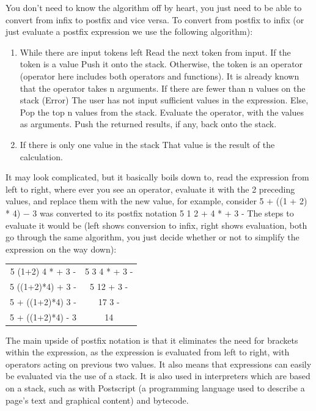 You don't need to know the algorithm off by heart, you just need to be able to convert from infix to postfix and vice versa. To convert from postfix to infix (or just evaluate a postfix expression we use the following algorithm):
\begin{enumerate}
	\item While there are input tokens left
		Read the next token from input.
		If the token is a value
			Push it onto the stack.
		Otherwise, the token is an operator (operator here includes both operators and functions).
			It is already known that the operator takes n arguments.
			If there are fewer than n values on the stack
				(Error) The user has not input sufficient values in the expression.
			Else, Pop the top n values from the stack.
			Evaluate the operator, with the values as arguments.
			Push the returned results, if any, back onto the stack.
	\item If there is only one value in the stack
		That value is the result of the calculation.
\end{enumerate}

It may look complicated, but it basically boils down to, read the expression from left to right, where ever you see an operator, evaluate it with the 2 preceding values, and replace them with the new value, for example,
consider 5 + ((1 + 2) * 4) − 3 was converted to its postfix notation
5 1 2 + 4 * + 3 -
The steps to evaluate it would be (left shows conversion to infix, right shows evaluation, both go through the same algorithm, you just decide whether or not to simplify the expression on the way down):

\begin{table}[H]
	\begin{tabular}{cc}
		5 (1+2) 4 * + 3 - & 5 3 4 * + 3 - \\
		5 ((1+2)*4) + 3 - & 5 12 + 3 - \\
		5 + ((1+2)*4) 3 - & 17 3 - \\
		5 + ((1+2)*4) - 3 & 14 \\
	\end{tabular}
\end{table}

The main upside of postfix notation is that it eliminates the need for brackets within the expression, as the expression is evaluated from left to right, with operators acting on previous two values. It also means that expressions can easily be evaluated via the use of a stack. It is also used in interpreters which are based on a stack, such as with Postscript (a programming language used to describe a page's text and graphical content) and bytecode.


